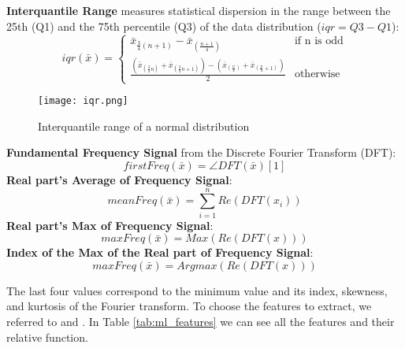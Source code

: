 \textbf{Interquantile Range} measures statistical dispersion in the range between the 25th (Q1) and the 75th percentile (Q3) of the data distribution ($ iqr = Q3 - Q1 $):
        \begin{equation}
            iqr(\bar{x}) =  
                \begin{cases} 
                \bar{x}_{\frac{3}{4}(n+1)} - \bar{x}_{(\frac{n+1}{4})} & \text{if n is odd} \\
                \frac{(\bar{x}_{(\frac{3}{4}n)} + \bar{x}_{(\frac{3}{4}n+1)}) - (\bar{x}_{(\frac{n}{4})} + \bar{x}_{(\frac{n}{4}+1)})}{2} & \text{otherwise}
                \end{cases}
        \end{equation}
        \begin{figure}[H]
            \centering
            \texttt{[image: iqr.png]}
            \caption{Interquantile range of a normal distribution}
            \label{fig:iqr}
        \end{figure}
\textbf{Fundamental Frequency Signal} from the Discrete Fourier Transform (DFT):
    \begin{equation}
        firstFreq(\bar{x}) = \angle DFT(\bar{x})[1]
    \end{equation}
\textbf{Real part's Average of Frequency Signal}:
    \begin{equation}
        meanFreq(\bar{x}) = \sum_{i=1}^{n} Re(DFT(x_i))
    \end{equation}
\textbf{Real part's Max of Frequency Signal}:
    \begin{equation}
        maxFreq(\bar{x}) = Max(Re(DFT(x)))
    \end{equation}
\textbf{Index of the Max of the Real part of Frequency Signal}:
    \begin{equation}
        maxFreq(\bar{x}) = Argmax(Re(DFT(x)))
    \end{equation}

The last four values correspond to the minimum value and its index, skewness, and kurtosis of the Fourier transform.
To choose the features to extract, we referred to \cite{oneto:2020} and \cite{sama:2010}.
In Table \ref{tab:ml_features} we can see all the features and their relative function.

